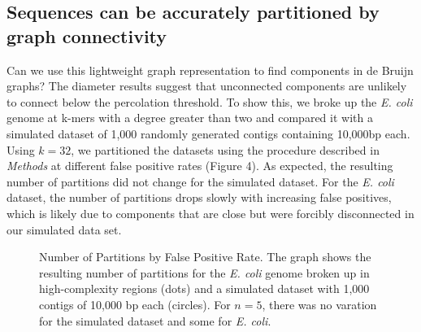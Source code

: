 \documentclass[12pt]{article} \usepackage{simplemargins}
\begin{document}
\subsection{Sequences can be accurately partitioned by graph connectivity}

Can we use this lightweight graph representation to find components in
de Bruijn graphs?  The diameter results suggest that unconnected
components are unlikely to connect below the percolation threshold. To
show this, we broke up the \emph{E. coli} genome at k-mers with a
degree greater than two and compared it with a simulated dataset of
1,000 randomly generated contigs containing 10,000bp each. Using
$k=32$, we partitioned the datasets using the procedure described in
\emph{Methods} at different false positive rates (Figure 4). As
expected, the resulting number of partitions did not change for the
simulated dataset. For the \emph{E. coli} dataset, the number of
partitions drops slowly with increasing false positives, which is
likely due to components that are close but were forcibly disconnected
in our simulated data set.

\begin{figure}

\caption{Number of Partitions by False Positive Rate. The graph shows
  the resulting number of partitions for the \emph{E. coli} genome
  broken up in high-complexity regions (dots) and a simulated dataset
  with 1,000 contigs of 10,000 bp each (circles). For $n=5$, there was
  no varation for the simulated dataset and some for \emph{E. coli}.}
\end{figure}
\end{document}
